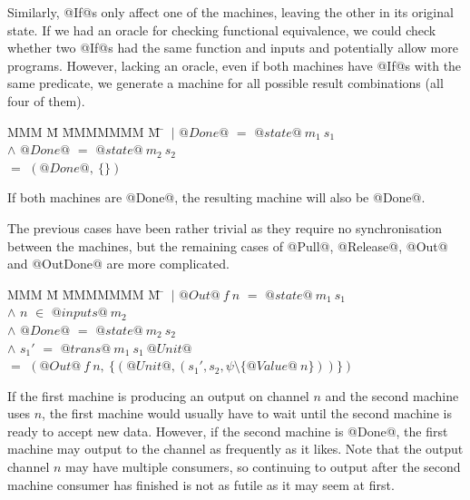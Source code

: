 Similarly, @If@s only affect one of the machines, leaving the other in its original state.
If we had an oracle for checking functional equivalence, we could check whether two @If@s had the same function and inputs and potentially allow more programs.
However, lacking an oracle, even if both machines have @If@s with the same predicate, we generate a machine for all possible result combinations (all four of them).

\begin{tabbing}
MMM \= M \= MMMMMMM \= M \=\kill
 \> $~|$ \> $@Done@$ \> $=$ \> $@state@~m_1~s_1$ \\
 \> $\wedge$ \> $@Done@$ \> $=$ \> $@state@~m_2~s_2$ \\
 \> $=$ \> $(@Done@,~\{\})$ \\
\end{tabbing}

If both machines are @Done@, the resulting machine will also be @Done@.

The previous cases have been rather trivial as they require no synchronisation between the machines, but the remaining cases of @Pull@, @Release@, @Out@ and @OutDone@ are more complicated.

\begin{tabbing}
MMM \= M \= MMMMMMM \= M \=\kill
 \> $~|$ \> $@Out@~f~n$ \> $=$ \> $@state@~m_1~s_1$ \\
 \> $\wedge$ \> $n$      \> $\in$ \> $@inputs@~m_2$ \\
 \> $\wedge$ \> $@Done@$ \> $=$ \> $@state@~m_2~s_2$ \\
 \> $\wedge$ \> $s_1'$     \> $=$ \> $@trans@~m_1~s_1~@Unit@$ \\
 \> $=$ \> $(@Out@~f~n,~\{(@Unit@, (s_1',s_2,\psi \setminus \{@Value@~n\} ))\})$ \\
\end{tabbing}

If the first machine is producing an output on channel $n$ and the second machine uses $n$, the first machine would usually have to wait until the second machine is ready to accept new data.
However, if the second machine is @Done@, the first machine may output to the channel as frequently as it likes.
Note that the output channel $n$ may have multiple consumers, so continuing to output after the second machine consumer has finished is not as futile as it may seem at first.

